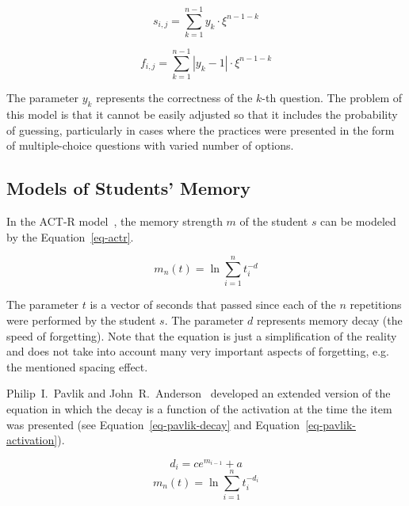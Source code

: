 \begin{equation} \label{eq-pfa-gong-s}
  s_{i,j} = \sum_{k=1}^{n-1} y_k \cdot \xi^{n-1-k}
\end{equation}

\begin{equation} \label{eq-pfa-gong-f}
  f_{i,j} = \sum_{k=1}^{n-1} |y_k - 1| \cdot \xi^{n-1-k}
\end{equation}

The parameter $y_k$ represents the correctness of the $k$-th question. 
The problem of this model is that it cannot be easily adjusted so that it includes the probability of guessing, particularly in cases where the practices were presented in the form of multiple-choice questions with varied number of options.


\subsection{Models of Students' Memory}
\label{spacing-effect}


In the ACT-R model~\cite{Pavlik2003}, the memory strength $m$ of the student $s$ can be modeled by the Equation~\ref{eq-actr}.

\begin{equation} \label{eq-actr}
  m_n(t) = \ln{\sum_{i=1}^{n} t_{i}^{-d}}
\end{equation}

The parameter $t$ is a vector of seconds that passed since each of the $n$ repetitions were performed by the student $s$. The parameter $d$ represents memory decay (the speed of forgetting). Note that the equation is just a simplification of the reality and does not take into account many very important aspects of forgetting, e.g. the mentioned spacing effect.

Philip~I.~Pavlik and John~R.~Anderson~\cite{Pavlik2005} developed an extended version of the equation in which the decay is a function of the activation at the time the item was presented (see Equation~\ref{eq-pavlik-decay} and Equation~\ref{eq-pavlik-activation}).

\begin{equation} \label{eq-pavlik-decay}
  d_i = ce^{m_{i-1}} + a
\end{equation}
\begin{equation} \label{eq-pavlik-activation}
  m_n(t) = \ln{\sum_{i=1}^{n} t_{i}^{-d_i}}
\end{equation}

